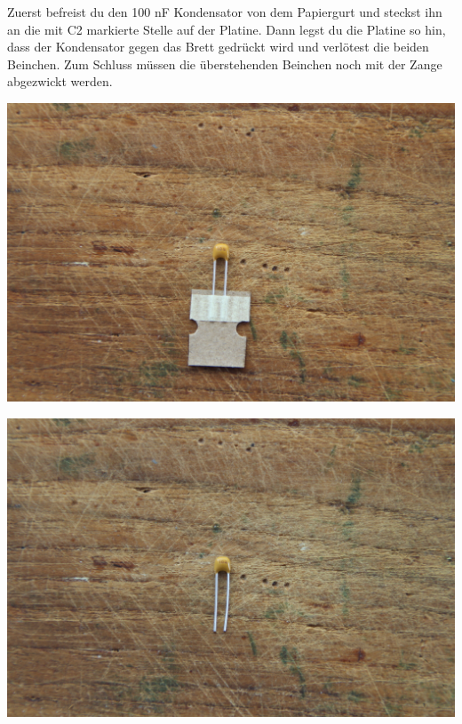 \documentclass{article}
\begin{document}
Zuerst befreist du den 100 nF Kondensator von dem Papiergurt und steckst ihn an die mit C2 markierte Stelle auf der Platine.
Dann legst du die Platine so hin, dass der Kondensator gegen das Brett gedrückt wird und verlötest die beiden Beinchen.
Zum Schluss müssen die überstehenden Beinchen noch mit der Zange abgezwickt werden.

\vspace{1cm}

\begin{minipage}[b]{0.5\textwidth}
	\includegraphics[width=\textwidth]{Bilder2023/IMG_8336.JPG}
\end{minipage}
\begin{minipage}[b]{0.5\textwidth}
	\includegraphics[width=\textwidth]{Bilder2023/IMG_8337.JPG}
\end{minipage}
\end{document}
